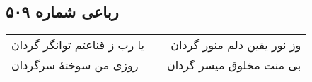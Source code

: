 \begin{center}
\section*{رباعی شماره ۵۰۹}
\label{sec:sh509}
\begin{longtable}{l p{0.5cm} r}
یا رب ز قناعتم توانگر گردان
&&
وز نور یقین دلم منور گردان
\\
روزی من سوختهٔ سرگردان
&&
بی منت مخلوق میسر گردان
\\
\end{longtable}
\end{center}
